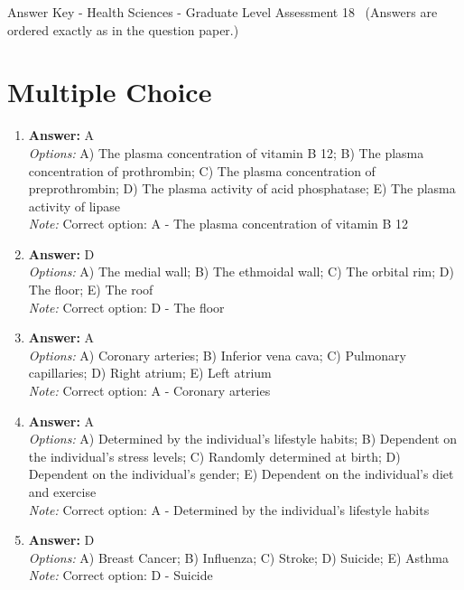 \documentclass[12pt]{article}
\begin{document}
\begin{center}
Answer Key - Health Sciences - Graduate Level Assessment 18 \
\small (Answers are ordered exactly as in the question paper.)
\end{center}

\section*{Multiple Choice}
\begin{enumerate}[label=\arabic*.]
\item \textbf{Answer:} A
\\ \textit{Options:} A) The plasma concentration of vitamin B 12; B) The plasma concentration of prothrombin; C) The plasma concentration of preprothrombin; D) The plasma activity of acid phosphatase; E) The plasma activity of lipase
\\ \textit{Note:} Correct option: A - The plasma concentration of vitamin B 12
\item \textbf{Answer:} D
\\ \textit{Options:} A) The medial wall; B) The ethmoidal wall; C) The orbital rim; D) The floor; E) The roof
\\ \textit{Note:} Correct option: D - The floor
\item \textbf{Answer:} A
\\ \textit{Options:} A) Coronary arteries; B) Inferior vena cava; C) Pulmonary capillaries; D) Right atrium; E) Left atrium
\\ \textit{Note:} Correct option: A - Coronary arteries
\item \textbf{Answer:} A
\\ \textit{Options:} A) Determined by the individual's lifestyle habits; B) Dependent on the individual's stress levels; C) Randomly determined at birth; D) Dependent on the individual's gender; E) Dependent on the individual's diet and exercise
\\ \textit{Note:} Correct option: A - Determined by the individual's lifestyle habits
\item \textbf{Answer:} D
\\ \textit{Options:} A) Breast Cancer; B) Influenza; C) Stroke; D) Suicide; E) Asthma
\\ \textit{Note:} Correct option: D - Suicide
\end{enumerate}
\end{document}
